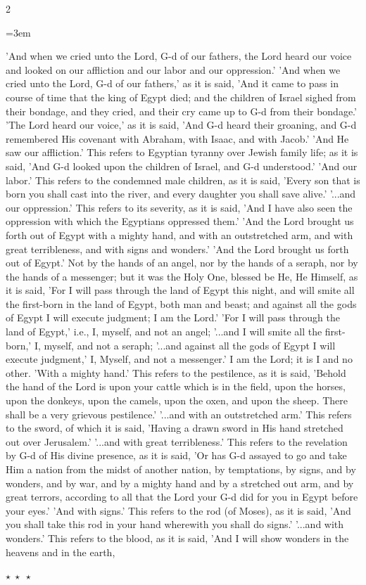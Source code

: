 \documentclass[11pt, openany]{book}
\newcommand{\sederdivider}{%
  \par\vspace{6pt}
  \begin{center}
    \textcolor{sedergold}{\large$\star\;\star\;\star$}
  \end{center}
  \par\vspace{6pt}
}
\newenvironment{bilingual}{%
  \par\vspace{4pt}%
  \begin{paracol}{2}%
}{%
  \end{paracol}%
  \par\vspace{2pt}%
}
\newenvironment{englishcol}{%
  \switchcolumn[0]%
  \begingroup
  \setstretch{1.4}%
  \emergencystretch=3em
  \tolerance=9999
  \normalsize
  \rightskip=0.12in\relax
}{%
  \endgroup
}
\begin{document}
\begin{bilingual}
\begin{englishcol}
'And when we cried unto the Lord, G-d of our fathers, the Lord heard our voice and looked on our affliction and our labor and our oppression.' 'And when we cried unto the Lord, G-d of our fathers,' as it is said, 'And it came to pass in course of time that the king of Egypt died; and the children of Israel sighed from their bondage, and they cried, and their cry came up to G-d from their bondage.'
'The Lord heard our voice,' as it is said, 'And G-d heard their groaning, and G-d remembered His covenant with Abraham, with Isaac, and with Jacob.'
'And He saw our affliction.' This refers to Egyptian tyranny over Jewish family life; as it is said, 'And G-d looked upon the children of Israel, and G-d understood.'
'And our labor.' This refers to the condemned male children, as it is said, 'Every son that is born you shall cast into the river, and every daughter you shall save alive.' '...and our oppression.' This refers to its severity, as it is said, 'And I have also seen the oppression with which the Egyptians oppressed them.'
'And the Lord brought us forth out of Egypt with a mighty hand, and with an outstretched arm, and with great terribleness, and with signs and wonders.' 'And the Lord brought us forth out of Egypt.' Not by the hands of an angel, nor by the hands of a seraph, nor by the hands of a messenger; but it was the Holy One, blessed be He, He Himself, as it is said, 'For I will pass through the land of Egypt this night, and will smite all the first-born in the land of Egypt, both man and beast; and against all the gods of Egypt I will execute judgment; I am the Lord.' 'For I will pass through the land of Egypt,' i.e., I, myself, and not an angel; '...and I will smite all the first-born,' I, myself, and not a seraph; '...and against all the gods of Egypt I will execute judgment,' I, Myself, and not a messenger.' I am the Lord; it is I and no other.
'With a mighty hand.' This refers to the pestilence, as it is said, 'Behold the hand of the Lord is upon your cattle which is in the field, upon the horses, upon the donkeys, upon the camels, upon the oxen, and upon the sheep. There shall be a very grievous pestilence.' '...and with an outstretched arm.' This refers to the sword, of which it is said, 'Having a drawn sword in His hand stretched out over Jerusalem.' '...and with great terribleness.' This refers to the revelation by G-d of His divine presence, as it is said, 'Or has G-d assayed to go and take Him a nation from the midst of another nation, by temptations, by signs, and by wonders, and by war, and by a mighty hand and by a stretched out arm, and by great terrors, according to all that the Lord your G-d did for you in Egypt before your eyes.'
'And with signs.' This refers to the rod (of Moses), as it is said, 'And you shall take this rod in your hand wherewith you shall do signs.' '...and with wonders.' This refers to the blood, as it is said, 'And I will show wonders in the heavens and in the earth,
\end{englishcol}
\end{bilingual}
\sederdivider
\end{document}
